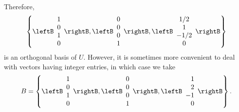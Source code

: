 \begin{solution}
Therefore,
\[ \left\{ 
\leftB\begin{array}{c} 1\\ 0\\ 1\\ 0 \end{array}\rightB,
\leftB\begin{array}{c} 0\\ 0\\ 0\\ 1 \end{array}\rightB,
\leftB\begin{array}{c} 1/2\\ 1\\ -1/2\\ 0 \end{array}\rightB
\right\}\]
is an orthogonal basis of $U$.
However, it is sometimes more convenient to deal with vectors
having integer entries, in which case we take
\[ B=\left\{ 
\leftB\begin{array}{c} 1\\ 0\\ 1\\ 0 \end{array}\rightB,
\leftB\begin{array}{c} 0\\ 0\\ 0\\ 1 \end{array}\rightB,
\leftB\begin{array}{r} 1\\ 2\\ -1\\ 0 \end{array}\rightB
\right\}.\]
\end{solution}